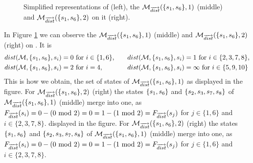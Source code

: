 \documentclass[preview]{standalone}
\begin{document}
\begin{figure}[!htb]
	\begin{minipage}{.45\textwidth}
		
	\end{minipage}%
	\begin{minipage}{.20\textwidth}
		
	\end{minipage}
	\hspace{-6pt}
	\begin{minipage}{.35\textwidth}
		\vspace{1.7mm}
		
	\end{minipage}	
	\caption{Simplified representations of \mdp (left), the \viewsN ${{{{{\mathcal{M}}}}_{{\overrightarrow{{dist}}}}}}(\{{s}_1, {s}_6\}, 1)$ (middle) and ${{{{{\mathcal{M}}}}_{{\overrightarrow{{dist}}}}}}(\{{s}_1, {s}_6\}, 2)$ on it (right).}
	\label{fig:Distance} 
\end{figure}

\begin{exmp}
	In Figure \ref{fig:Distance} we can observe the \viewsN ${{{{{\mathcal{M}}}}_{{\overrightarrow{{dist}}}}}}(\{{s}_1, {s}_6\}, 1)$ (middle) and ${{{{{\mathcal{M}}}}_{{\overrightarrow{{dist}}}}}}(\{{s}_1, {s}_6\}, 2)$ (right) on \chgph. It is
\begin{alignat*}{4}
	{dist}({{{\mathcal{M}}}}, \{{s}_1, {s}_6\}, {s}_i) &= 0 \text{ for } i \in \{1,6\}, \quad &&{dist}({{{\mathcal{M}}}}, \{{s}_1, {s}_6\}, {s}_i) = 1 \text{ for } i \in \{2,3,7,8\},\\
	{dist}({{{\mathcal{M}}}}, \{{s}_1, {s}_6\}, {s}_i) &= 2 \text{ for } i = 4, \quad &&{dist}({{{\mathcal{M}}}}, \{{s}_1, {s}_6\}, {s}_i) = \infty \text{ for } i \in \{5,9,10\}
\end{alignat*}
This is how we obtain, the set of states of ${{{{{\mathcal{M}}}}_{{\overrightarrow{{dist}}}}}}(\{{s}_1, {s}_6\}, 1)$ as displayed in the figure. For ${{{{{\mathcal{M}}}}_{{\overrightarrow{{dist}}}}}}(\{{s}_1, {s}_6\}, 2)$ (right) the states $\{{s}_1, {s}_6\}$ and $\{{s}_2, {s}_3, {s}_7, {s}_8\}$ of ${{{{{\mathcal{M}}}}_{{\overrightarrow{{dist}}}}}}(\{{s}_1, {s}_6\}, 1)$ (middle) merge into one, as ${{F_{{\overrightarrow{{dist}}}}}}({s}_i) = 0 - (0 \text{ mod } 2) = 0 = 1 - (1 \text{ mod } 2) = {{F_{{\overrightarrow{{dist}}}}}}({s}_j)$ for $j \in \{1,6\}$ and $i \in \{2,3,7,8\}$. displayed in the figure. For ${{{{{\mathcal{M}}}}_{{\overrightarrow{{dist}}}}}}(\{{s}_1, {s}_6\}, 2)$ (right) the states $\{{s}_1, {s}_6\}$ and $\{{s}_2, {s}_3, {s}_7, {s}_8\}$ of ${{{{{\mathcal{M}}}}_{{\overrightarrow{{dist}}}}}}(\{{s}_1, {s}_6\}, 1)$ (middle) merge into one, as ${{F_{{\overrightarrow{{dist}}}}}}({s}_i) = 0 - (0 \text{ mod } 2) = 0 = 1 - (1 \text{ mod } 2) = {{F_{{\overrightarrow{{dist}}}}}}({s}_j)$ for $j \in \{1,6\}$ and $i \in \{2,3,7,8\}$.
\end{exmp}
\end{document}
